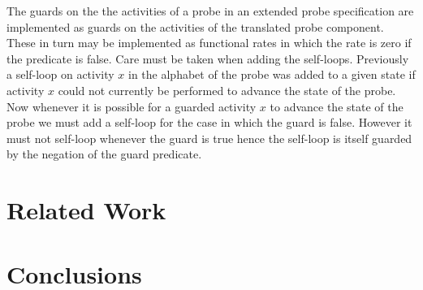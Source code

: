 \documentclass[times, 10pt,twocolumn]{article}
\newcommand{\quoteActivity}[1]{$#1$}
\begin{document}
The guards on the the activities of a probe in an extended probe specification
are implemented as guards on the activities of the translated probe component.
These in turn may be implemented as functional rates in which the rate is
zero if the predicate is false. Care must be taken when adding the self-loops.
Previously a self-loop on activity \quoteActivity{x} in the alphabet of the probe
was added to a given state if activity \quoteActivity{x} could not currently
be performed to advance the state of the probe.
Now whenever it is possible for a guarded activity \quoteActivity{x} to advance
the state of the probe we must add a self-loop for the case in which the guard
is false. However it must not self-loop whenever the guard is true hence the
self-loop is itself guarded by the negation of the guard predicate.

\section{Related Work}

\section{Conclusions}



\end{document}
